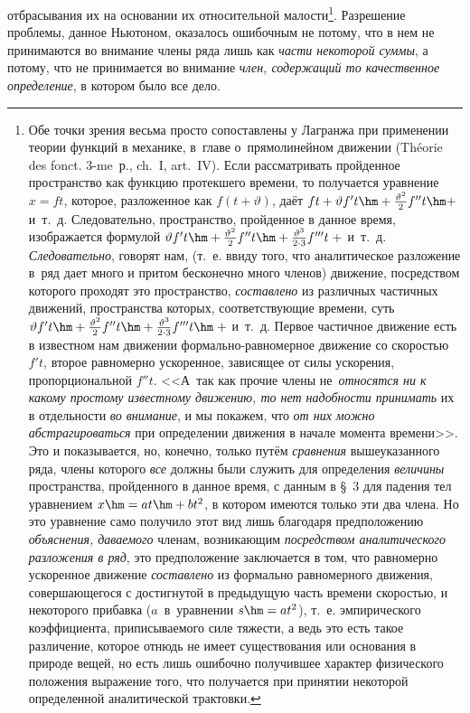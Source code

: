 отбрасывания их на основании их относительной малости\footnote{Обе точки зрения
весьма просто сопоставлены у Лагранжа при применении теории функций в механике,
в~главе о~прямолинейном движении (Théorie des fonct. 3-me~р., ch.~I, art.~IV).
Если рассматривать пройденное пространство как функцию протекшего времени, то
получается уравнение $x=ft$, которое, разложенное как $f(t+\vartheta)$, даёт
$ft+\vartheta f't\hm+\frac{\vartheta^2}2f''t\hm+$ и~т.~д. Следовательно,
пространство, пройденное в данное время, изображается формулой
$\vartheta f't\hm+\frac{\vartheta^2}2f''t\hm+
\frac{\vartheta^3}{2\cdot 3}f'''t\;+$ и~т.~д. {\em Следовательно}, говорят нам,
(т.~е. ввиду того, что аналитическое разложение в~ряд дает много и притом
бесконечно много членов) движение, посредством которого проходят это
пространство, {\em составлено} из различных частичных движений, пространства
которых, соответствующие времени, суть
$\vartheta f't\hm+\frac{\vartheta^2}2f''t\hm+
\frac{\vartheta^3}{2\cdot 3}f'''t\hm\;+$ и~т.~д. Первое частичное движение
есть в известном нам движении формально-равномерное движение со скоростью
$f't$, второе равномерно ускоренное, зависящее от силы ускорения,
пропорциональной $f''t$. <<А~так как прочие члены не~{\em относятся ни к какому
простому известному движению, то нет надобности принимать} их в отдельности
{\em во внимание}, и мы покажем, что {\em от них можно абстрагироваться} при
определении движения в начале момента времени>>. Это и показывается, но,
конечно, только путём {\em сравнения} вышеуказанного ряда, члены которого
{\em все} должны были служить для определения {\em величины} пространства,
пройденного в данное время, с данным в \S~3 для падения тел уравнением
$x\hm=at\hm+bt^2$, в котором имеются только эти два члена. Но это уравнение
само получило этот вид лишь благодаря предположению {\em объяснения, даваемого}
членам, возникающим {\em посредством аналитического разложения в ряд}, это
предположение заключается в том, что равномерно ускоренное движение
{\em составлено} из формально равномерного движения, совершающегося
с достигнутой в предыдущую часть времени скоростью, и некоторого прибавка
($a$~в~уравнении $s\hm=at^2$), т.~е. эмпирического коэффициента, приписываемого
силе тяжести, а ведь это есть такое различение, которое отнюдь не имеет
существования или основания в природе вещей, но есть лишь ошибочно получившее
характер физического положения выражение того, что получается при принятии
некоторой определенной аналитической трактовки.}. Разрешение проблемы, данное
Ньютоном, оказалось ошибочным не потому, что в нем не принимаются во внимание
члены ряда лишь как {\em части некоторой суммы}, а потому, что не принимается
во внимание {\em член, содержащий то качественное определение}, в котором было
все дело.

